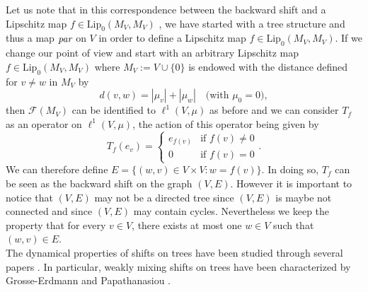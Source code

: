 \documentclass[12pt,english]{amsart}
\numberwithin{equation}{section}
\theoremstyle{plain}
\theoremstyle{definition}
\def\pare{\text{par}}
\newcommand{\free}[1]{\mathcal{F}(#1)}
\def\lip{ \text{Lip}}
\begin{document}
Let us note that in this correspondence between the backward shift and a Lipschitz map $f\in\lip_0(M_V,M_V)$ , we have started with a tree structure and thus a map $\textit{\pare}$ on $V$ in order to define a Lipschitz map $f\in \lip_0(M_V,M_V)$. If we change our point of view and start with an arbitrary Lipschitz map $f\in \lip_0(M_V,M_V)$ where $M_V:=V \cup \{0\}$ is endowed with the distance defined for $v\ne w$ in $M_V$ by
\[
d(v,w)=|\mu_v|+|\mu_w| \quad \text{(with $\mu_0=0$)},
\]
then $\free{M_V}$ can be identified to $ \ell^1(V,\mu)$ as before and we can consider $T_f$ as an operator on $ \ell^1(V,\mu)$, the action of this operator being given by 
\[T_f(e_v)=\begin{cases} e_{f(v)} &\text{if $f(v)\ne 0$}\\
0 &\text{if $f(v)=0$}\end{cases}.\]
We can therefore define $E=\{(w,v)\in V\times V: w=f(v)\}$. In doing so, $T_f$ can be seen as the backward shift on the graph $(V,E)$. However it is important to notice that $(V,E)$ may not be a directed tree since $(V,E)$ is maybe not connected and since $(V,E)$ may contain cycles. Nevertheless we keep the property that for every $v\in V$, there exists at most one $w\in V$ such that $(w,v)\in E$.\\

The dynamical properties of shifts on trees have been studied through several papers \cite{Ma17, GEPa23, AA25, LP25, GePapreprint, AC26}. In particular, weakly mixing shifts on trees have been characterized by Grosse-Erdmann and Papathanasiou \cite{GEPa23}.
\end{document}
